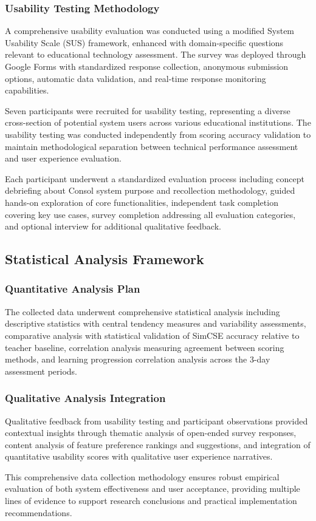 {\subsubsection{Usability Testing Methodology}

A comprehensive usability evaluation was conducted using a modified System Usability Scale (SUS) framework, enhanced with domain-specific questions relevant to educational technology assessment. The survey was deployed through Google Forms with standardized response collection, anonymous submission options, automatic data validation, and real-time response monitoring capabilities.

Seven participants were recruited for usability testing, representing a diverse cross-section of potential system users across various educational institutions. The usability testing was conducted independently from scoring accuracy validation to maintain methodological separation between technical performance assessment and user experience evaluation.

Each participant underwent a standardized evaluation process including concept debriefing about Consol system purpose and recollection methodology, guided hands-on exploration of core functionalities, independent task completion covering key use cases, survey completion addressing all evaluation categories, and optional interview for additional qualitative feedback.

\subsection{Statistical Analysis Framework}

\subsubsection{Quantitative Analysis Plan}

The collected data underwent comprehensive statistical analysis including descriptive statistics with central tendency measures and variability assessments, comparative analysis with statistical validation of SimCSE accuracy relative to teacher baseline, correlation analysis measuring agreement between scoring methods, and learning progression correlation analysis across the 3-day assessment periods.

\subsubsection{Qualitative Analysis Integration}

Qualitative feedback from usability testing and participant observations provided contextual insights through thematic analysis of open-ended survey responses, content analysis of feature preference rankings and suggestions, and integration of quantitative usability scores with qualitative user experience narratives.

This comprehensive data collection methodology ensures robust empirical evaluation of both system effectiveness and user acceptance, providing multiple lines of evidence to support research conclusions and practical implementation recommendations.
}

